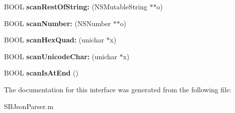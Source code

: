 \begin{DoxyCompactItemize}
\item 
\hypertarget{interface_s_b_json_parser_07_08_a0b251c81dc2753e3330709af36112429}{
\-B\-O\-O\-L {\bfseries scan\-Rest\-Of\-String\-:} (\-N\-S\-Mutable\-String $\ast$$\ast$o)}
\label{interface_s_b_json_parser_07_08_a0b251c81dc2753e3330709af36112429}

\item 
\hypertarget{interface_s_b_json_parser_07_08_a40ea5a3426e2af523b6f4355fc41e0e7}{
\-B\-O\-O\-L {\bfseries scan\-Number\-:} (\-N\-S\-Number $\ast$$\ast$o)}
\label{interface_s_b_json_parser_07_08_a40ea5a3426e2af523b6f4355fc41e0e7}

\item 
\hypertarget{interface_s_b_json_parser_07_08_a940e3c61c38e199844bf1a9fbc41138d}{
\-B\-O\-O\-L {\bfseries scan\-Hex\-Quad\-:} (unichar $\ast$x)}
\label{interface_s_b_json_parser_07_08_a940e3c61c38e199844bf1a9fbc41138d}

\item 
\hypertarget{interface_s_b_json_parser_07_08_aea014e27d084f4d34e3025089c62aa74}{
\-B\-O\-O\-L {\bfseries scan\-Unicode\-Char\-:} (unichar $\ast$x)}
\label{interface_s_b_json_parser_07_08_aea014e27d084f4d34e3025089c62aa74}

\item 
\hypertarget{interface_s_b_json_parser_07_08_a968fa7546f80d05c2d3d53fe57a2cece}{
\-B\-O\-O\-L {\bfseries scan\-Is\-At\-End} ()}
\label{interface_s_b_json_parser_07_08_a968fa7546f80d05c2d3d53fe57a2cece}

\end{DoxyCompactItemize}


\-The documentation for this interface was generated from the following file\-:\begin{DoxyCompactItemize}
\item 
\-S\-B\-Json\-Parser.\-m\end{DoxyCompactItemize}
